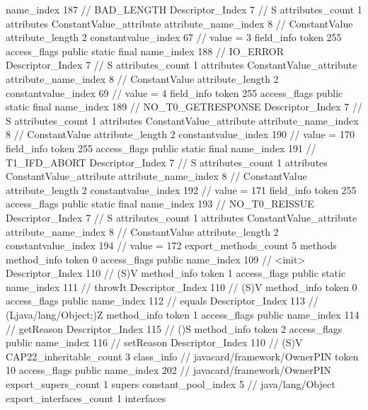 {{{{{				name_index	187		// BAD_LENGTH
				Descriptor_Index	7		// S
				attributes_count	1
				attributes {
				ConstantValue_attribute {
					attribute_name_index	8		// ConstantValue
					attribute_length	2
					constantvalue_index	67		// value = 3
				}
				}
			}
			field_info {
				token	255
				access_flags	public static final
				name_index	188		// IO_ERROR
				Descriptor_Index	7		// S
				attributes_count	1
				attributes {
				ConstantValue_attribute {
					attribute_name_index	8		// ConstantValue
					attribute_length	2
					constantvalue_index	69		// value = 4
				}
				}
			}
			field_info {
				token	255
				access_flags	public static final
				name_index	189		// NO_T0_GETRESPONSE
				Descriptor_Index	7		// S
				attributes_count	1
				attributes {
				ConstantValue_attribute {
					attribute_name_index	8		// ConstantValue
					attribute_length	2
					constantvalue_index	190		// value = 170
				}
				}
			}
			field_info {
				token	255
				access_flags	public static final
				name_index	191		// T1_IFD_ABORT
				Descriptor_Index	7		// S
				attributes_count	1
				attributes {
				ConstantValue_attribute {
					attribute_name_index	8		// ConstantValue
					attribute_length	2
					constantvalue_index	192		// value = 171
				}
				}
			}
			field_info {
				token	255
				access_flags	public static final
				name_index	193		// NO_T0_REISSUE
				Descriptor_Index	7		// S
				attributes_count	1
				attributes {
				ConstantValue_attribute {
					attribute_name_index	8		// ConstantValue
					attribute_length	2
					constantvalue_index	194		// value = 172
				}
				}
			}
			}
			export_methods_count	5
			methods {
				method_info {
					token	0
					access_flags	public
					name_index	109		// <init>
					Descriptor_Index	110		// (S)V
				}
				method_info {
					token	1
					access_flags	public static
					name_index	111		// throwIt
					Descriptor_Index	110		// (S)V
				}
				method_info {
					token	0
					access_flags	public
					name_index	112		// equals
					Descriptor_Index	113		// (Ljava/lang/Object;)Z
				}
				method_info {
					token	1
					access_flags	public
					name_index	114		// getReason
					Descriptor_Index	115		// ()S
				}
				method_info {
					token	2
					access_flags	public
					name_index	116		// setReason
					Descriptor_Index	110		// (S)V
				}
			}
			CAP22_inheritable_count	3
		}
		class_info {		// javacard/framework/OwnerPIN
			token	10
			access_flags	public
			name_index	202		// javacard/framework/OwnerPIN
			export_supers_count	1
			supers {
				constant_pool_index	5		// java/lang/Object
			}
			export_interfaces_count	1
			interfaces {
}}}}
